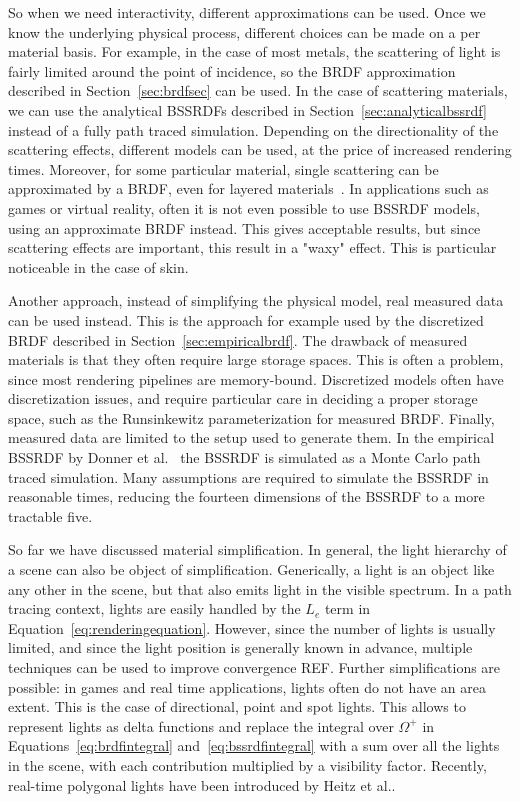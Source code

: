 So when we need interactivity, different approximations can be used. Once we know the underlying physical process, different choices can be made on a per material basis. For example, in the case of most metals, the scattering of light is fairly limited around the point of incidence, so the BRDF approximation described in Section~\ref{sec:brdfsec} can be used. In the case of scattering materials, we can use the analytical BSSRDFs described in Section~\ref{sec:analyticalbssrdf} instead of a fully path traced simulation. Depending on the directionality of the scattering effects, different models can be used, at the price of increased rendering times. Moreover, for some particular material, single scattering can be approximated by a BRDF, even for layered materials~\cite{Blinn1982, Hanrahan1993}. In applications such as games or virtual reality, often it is not even possible to use BSSRDF models, using an approximate BRDF instead. This gives acceptable results, but since scattering effects are important, this result in a "waxy" effect. This is particular noticeable in the case of skin. 

Another approach, instead of simplifying the physical model, real measured data can be used instead. This is the approach for example used by the discretized BRDF described in Section~\ref{sec:empiricalbrdf}. The drawback of measured materials is that they often require large storage spaces. This is often a problem, since most rendering pipelines are memory-bound. Discretized models often have discretization issues, and require particular care in deciding a proper storage space, such as the Runsinkewitz parameterization for measured BRDF. Finally, measured data are limited to the setup used to generate them. In the empirical BSSRDF by Donner et al.~\cite{Donner2009} the BSSRDF is simulated as a Monte Carlo path traced simulation. Many assumptions are required to simulate the BSSRDF in reasonable times, reducing the fourteen dimensions of the BSSRDF to a more tractable five.  

So far we have discussed material simplification. In general, the light hierarchy of a scene can also be object of simplification. Generically, a light is an object like any other in the scene, but that also emits light in the visible spectrum. In a path tracing context, lights are easily handled by the $L_e$ term in Equation~\ref{eq:renderingequation}. However, since the number of lights is usually limited, and since the light position is generally known in advance, multiple techniques can be used to improve convergence REF. Further simplifications are possible: in games and real time applications, lights often do not have an area extent. This is the case of directional, point and spot lights. This allows to represent lights as delta functions and replace the integral over $\Omega^+$ in Equations~\ref{eq:brdfintegral} and~\ref{eq:bssrdfintegral} with a sum over all the lights in the scene, with each contribution multiplied by a visibility factor. Recently, real-time polygonal lights have been introduced by Heitz et al.\cite{Heitz2016}.

